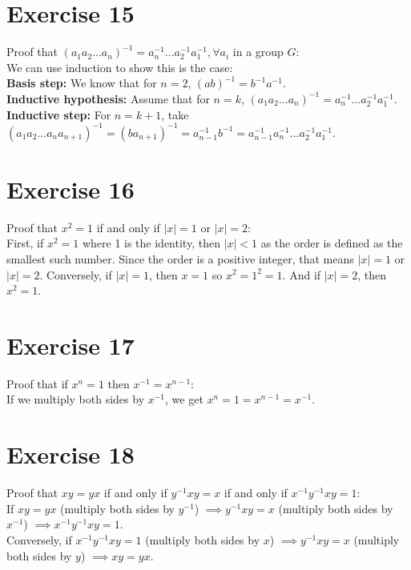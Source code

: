 \documentclass{article}
\begin{document}
    \section*{Exercise 15}
    Proof that $(a_1a_2...a_n)^{-1} = a_n^{-1}...a_2^{-1}a_1^{-1},
    \forall a_i$ in a group $G$: \\
    We can use induction to show this is the case:\\
    \textbf{Basis step:}
    We know that for $n = 2$, $(ab)^{-1}
    = b^{-1}a^{-1}$.\\
    \textbf{Inductive hypothesis:}
    Assume that for $n = k$, $(a_1a_2...a_n)^{-1}
    = a_n^{-1}...a_2^{-1}a_1^{-1}$. \\ 
    \textbf{Inductive step:}
    For $n = k + 1$,
    take $(a_1a_2...a_na_{n+1})^{-1}
    = (ba_{n+1})^{-1} = a_{n-1}^{-1}b^{-1}
    = a_{n-1}^{-1}a_n^{-1}...a_2^{-1}a_1^{-1}$.

    \section*{Exercise 16}
    Proof that $x^2 = 1$ if and only if $|x| = 1$ or $|x| = 2$: \\
    First, if $x^2 = 1$
    where 1 is the identity,
    then $|x| < 1$ as the order is defined as the smallest such number.
    Since the order is a positive integer,
    that means $|x| = 1$ or $|x| = 2$.
    Conversely, if $|x| = 1$,
    then $x = 1$ so $x^2 = 1^2 = 1$.
    And if $|x| = 2$,
    then $x^2 = 1$.


    \section*{Exercise 17}
    Proof that if $x^n = 1$ then $x^{-1} = x^{n-1}$: \\
    If we multiply both sides by $x^{-1}$,
    we get  $x^n = 1 = x^{n-1} = x^{-1}$.


    \section*{Exercise 18}
    Proof that $xy = yx$ if and only if $y^{-1}xy = x$
    if and only if $x^{-1}y^{-1}xy = 1$: \\
    If $xy = yx$
    (multiply both sides by $y^{-1}$)
    $\implies y^{-1}xy = x$
    (multiply both sides by $x^{-1}$)
    $\implies x^{-1}y^{-1}xy = 1$. \\
    Conversely, if $x^{-1}y^{-1}xy = 1$
    (multiply both sides by $x$)
    $\implies y^{-1}xy = x$
    (multiply both sides by $y$)
    $\implies xy = yx$.
\end{document}
